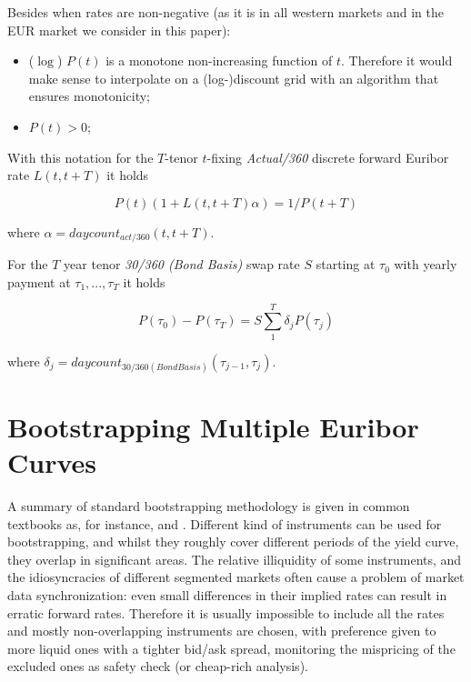 \documentclass[11pt,reqno]{amsart}
\begin{document}
Besides when rates are non-negative (as it is in all western markets and in the EUR market we consider in this paper):
\begin{itemize}
\item ($\log $) $P(t) $ is a monotone non-increasing function of $t$. Therefore it would make sense to interpolate on a (log-)discount grid with an algorithm that ensures monotonicity;
\item $P\left( t\right) >0$;
\end{itemize}

With this notation for the $T$-tenor $t$-fixing {\it Actual/360} discrete forward Euribor rate $L(t, t+T)$ it holds

\begin{equation}
P(t) (1 + L(t, t+T) \alpha) = 1/P(t+T)
\label{eqn:Euriborrate}
\end{equation}

where $\alpha = daycount_{act/360}(t,t+T)$.

For the $T$ year tenor {\it 30/360 (Bond Basis)} swap rate $S$ starting at $\tau_0$ with yearly payment at $\tau_1, ..., \tau_T$ it holds

\begin{equation}
P(\tau_0)-P(\tau_T) = S \sum_1^T \delta_j P(\tau_j)
\label{eqn:swaprate}
\end{equation}

where $\delta_j = daycount_{30/360 (Bond Basis)}(\tau_{j-1}, \tau_j)$.

\section{\label{SecBootstrapping}Bootstrapping Multiple Euribor Curves}
A summary of standard bootstrapping methodology is given in common textbooks as, for instance, \cite{Hull} and \cite{Rebonato}.  Different kind of instruments can be used for bootstrapping, and whilst they roughly cover different periods of the yield curve, they overlap in significant areas. The relative illiquidity of some instruments, and the idiosyncracies of different segmented markets often cause a problem of market data synchronization: even small differences in their implied rates can result in erratic forward rates. Therefore it is usually impossible to include all the rates and mostly non-overlapping instruments are chosen, with preference given to more liquid ones with a tighter bid/ask spread, monitoring the mispricing of the excluded ones as safety check (or cheap-rich analysis).
\end{document}
